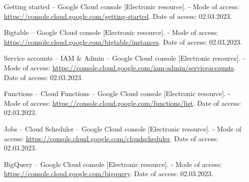 \documentclass[12pt, a4paper, simple]{eskdtext}
\begin{document}
    \begin{thebibliography}{}

      Getting started – Google Cloud console
      [Electronic resource]. -
      Mode of access:
      \url{https://console.cloud.google.com/getting-started}.
      Date of access: 02.03.2023.

      Bigtable – Google Cloud console
      [Electronic resource]. -
      Mode of access:
      \url{https://console.cloud.google.com/bigtable/instances}.
      Date of access: 02.03.2023.

      Service accounts – IAM \& Admin – Google Cloud console
      [Electronic resource]. -
      Mode of access:
      \url{https://console.cloud.google.com/iam-admin/serviceaccounts}.
      Date of access: 02.03.2023.

      Functions – Cloud Functions – Google Cloud console
      [Electronic resource]. -
      Mode of access:
      \url{https://console.cloud.google.com/functions/list}.
      Date of access: 02.03.2023.

      Jobs – Cloud Scheduler – Google Cloud console
      [Electronic resource]. -
      Mode of access:
      \url{https://console.cloud.google.com/cloudscheduler}.
      Date of access: 02.03.2023.

      BigQuery – Google Cloud console
      [Electronic resource]. -
      Mode of access:
      \url{https://console.cloud.google.com/bigquery}.
      Date of access: 02.03.2023.

    \end{thebibliography}
  \endgroup
\end{document}
